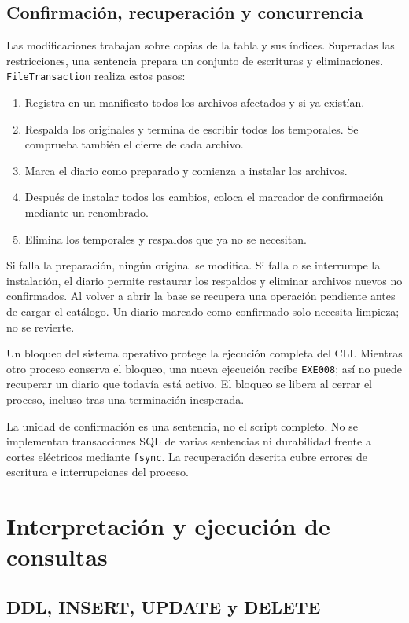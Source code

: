 \documentclass[11pt,a4paper]{article}
\begin{document}
\subsection{Confirmación, recuperación y concurrencia}

Las modificaciones trabajan sobre copias de la tabla y sus índices.
Superadas las restricciones, una sentencia prepara un conjunto de
escrituras y eliminaciones. \texttt{FileTransaction} realiza estos pasos:

\begin{enumerate}
  \item Registra en un manifiesto todos los archivos afectados y si ya existían.
  \item Respalda los originales y termina de escribir todos los temporales.
        Se comprueba también el cierre de cada archivo.
  \item Marca el diario como preparado y comienza a instalar los archivos.
  \item Después de instalar todos los cambios, coloca el marcador de
        confirmación mediante un renombrado.
  \item Elimina los temporales y respaldos que ya no se necesitan.
\end{enumerate}

Si falla la preparación, ningún original se modifica. Si falla o se
interrumpe la instalación, el diario permite restaurar los respaldos y
eliminar archivos nuevos no confirmados. Al volver a abrir la base se
recupera una operación pendiente antes de cargar el catálogo. Un diario
marcado como confirmado solo necesita limpieza; no se revierte.

Un bloqueo del sistema operativo protege la ejecución completa del CLI.
Mientras otro proceso conserva el bloqueo, una nueva ejecución recibe
\texttt{EXE008}; así no puede recuperar un diario que todavía está activo.
El bloqueo se libera al cerrar el proceso, incluso tras una terminación
inesperada.

La unidad de confirmación es una sentencia, no el script completo. No se
implementan transacciones SQL de varias sentencias ni durabilidad frente
a cortes eléctricos mediante \texttt{fsync}. La recuperación descrita
cubre errores de escritura e interrupciones del proceso.

\section{Interpretación y ejecución de consultas}
\subsection{DDL, INSERT, UPDATE y DELETE}
\end{document}

